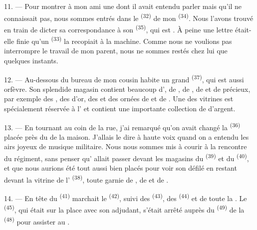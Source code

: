 \VUsaut{3.0mm}

11. --- Pour montrer à mon ami une  dont il avait
entendu parler mais qu'il ne connaissait pas, nous sommes entrés dans le
 \textsuperscript{(32)} de mon 
\textsuperscript{(34)}. Nous l'avons trouvé en train de dicter sa correspondance
à son  \textsuperscript{(35)}, qui est .
À peine une lettre était-elle finie qu'un 
\textsuperscript{(33)} la recopiait à la machine. Comme nous ne voulions pas
interrompre le travail de mon parent, nous ne sommes restés chez lui que
quelques instants.

12. --- Au-dessous du bureau de mon cousin habite un grand
 \textsuperscript{(37)}, qui est aussi orfèvre. Son
splendide magasin contient beaucoup d', de ,
de , de  et de  précieux, par
exemple des , des  d'or, des
 et des  ornées de  et de . Une des vitrines est spécialement réservée
à l' et contient une importante collection de
 d'argent.

13. --- En tournant au coin de la rue, j'ai remarqué qu'on avait changé la
 \textsuperscript{(36)} placée près du  de la
maison. J'allais le dire à haute voix quand on a entendu les airs joyeux de
 musique militaire. Nous nous sommes mis à courir à la rencontre du
régiment, sans penser qu' allait passer devant les magasins du
 \textsuperscript{(39)} et du 
\textsuperscript{(40)}, et que nous aurions été tout aussi bien placés pour voir
son défilé en restant devant la vitrine de l'
\textsuperscript{(38)}, toute garnie de , de
 et de .

\VUsaut{3.0mm}

14. --- En tête du  \textsuperscript{(41)} marchait le
 \textsuperscript{(42)}, suivi des 
\textsuperscript{(43)}, des  \textsuperscript{(44)} et de toute
la . Le  \textsuperscript{(45)}, qui était sur
la place avec son adjudant, s'était arrêté auprès du 
\textsuperscript{(49)} de la  \textsuperscript{(48)} pour
assister au .

